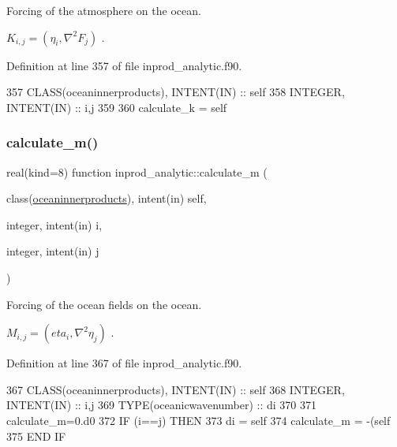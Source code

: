 Forcing of the atmosphere on the ocean. 

$ K_{i,j} = (\eta_i, \nabla^2 F_j)$ . 

Definition at line 357 of file inprod\+\_\+analytic.\+f90.


\begin{DoxyCode}
357     \textcolor{keywordtype}{CLASS}(oceaninnerproducts), \textcolor{keywordtype}{INTENT(IN)} :: self
358     \textcolor{keywordtype}{INTEGER}, \textcolor{keywordtype}{INTENT(IN)} :: i,j
359 
360     calculate\_k = self%
\end{DoxyCode}
\mbox{\label{namespaceinprod__analytic_a04bacbacbd212ad46418336455c30fb4}} 
\subsubsection{\texorpdfstring{calculate\+\_\+m()}{calculate\_m()}}
{\footnotesize\ttfamily real(kind=8) function inprod\+\_\+analytic\+::calculate\+\_\+m (\begin{DoxyParamCaption}\item[{class(\hyperlink{structinprod__analytic_1_1oceaninnerproducts}{oceaninnerproducts}), intent(in)}]{self,  }\item[{integer, intent(in)}]{i,  }\item[{integer, intent(in)}]{j }\end{DoxyParamCaption})\hspace{0.3cm}{\ttfamily [private]}}



Forcing of the ocean fields on the ocean. 

$ M_{i,j} = (eta_i, \nabla^2 \eta_j)$ . 

Definition at line 367 of file inprod\+\_\+analytic.\+f90.


\begin{DoxyCode}
367     \textcolor{keywordtype}{CLASS}(oceaninnerproducts), \textcolor{keywordtype}{INTENT(IN)} :: self
368     \textcolor{keywordtype}{INTEGER}, \textcolor{keywordtype}{INTENT(IN)} :: i,j
369     \textcolor{keywordtype}{TYPE}(oceanicwavenumber) :: di
370 
371     calculate\_m=0.d0
372     \textcolor{keywordflow}{IF} (i==j) \textcolor{keywordflow}{THEN}
373       di = self%
374       calculate\_m = -(self%
375 \textcolor{keywordflow}{    END IF}
\end{DoxyCode}
\mbox{\label{namespaceinprod__analytic_a83197d7b47ce78f414762a1d8fe410bf}} 
